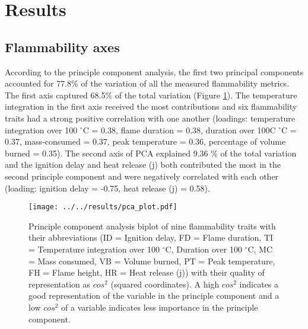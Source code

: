 \documentclass{ttuthes2007}
\begin{document}




\section*{\textbf{Results}}

\subsection*{\textbf{Flammability axes}}

\noindent According to the principle component analysis, the first two principal components accounted for 77.8\% of the variation of all the measured flammability metrics. The first axis %
captured 68.5\% of the total variation (Figure \ref{fig:pca-plot}). The temperature integration in the first axis received the most contributions and six flammability traits had a strong positive correlation with one another (loadings: temperature integration over 100 $^{\circ}$C = 0.38, flame duration = 0.38, duration over 100C $^{\circ}$C = 0.37, mass-consumed = 0.37, peak temperature  = 0.36, percentage of volume burned = 0.35). The second axis of PCA explained 9.36 \% of the total variation and the ignition delay and heat release (j) both contributed the most in the second principle component and were negatively correlated with each other (loading: ignition delay = -0.75, heat release (j) = 0.58). 

\begin{figure}  %
    \centering
    \texttt{[image: ../../results/pca\_plot.pdf]}
    \caption[Principle components results]{\label{fig:pca-plot} Principle component analysis biplot of nine flammability traits with their abbreviations (ID = Ignition delay, FD = Flame duration, TI = Temperature integration over 100 $^{\circ}$C, Duration over 100 $^{\circ}$C, MC = Mass consumed, VB = Volume burned, PT = Peak temperature, FH = Flame height, HR = Heat release (j)) with their quality of representation as $cos^2$ (squared coordinates). A high $cos^2$ indicates a good representation of the variable in the principle component and a low $cos^2$ of a variable indicates less importance in the principle component.}
  \end{figure}
\end{document}
